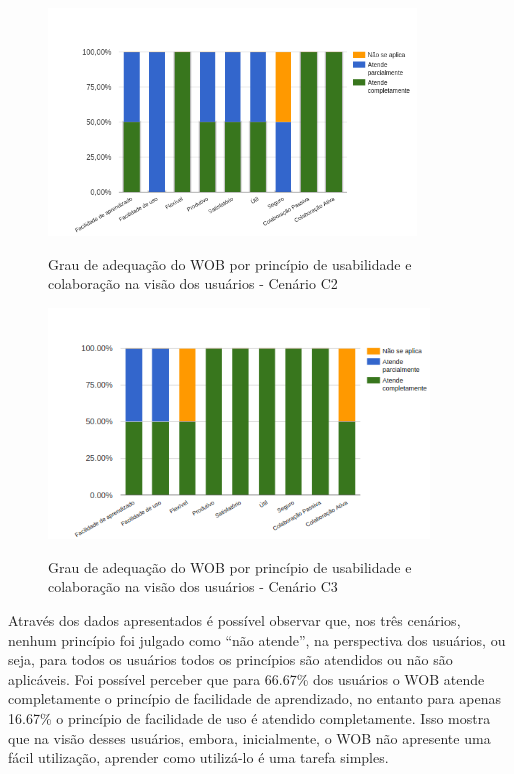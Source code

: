 \begin{figure}[!htb]
    \centering
    \caption{Grau de adequação do WOB por princípio de usabilidade e colaboração na visão dos usuários - Cenário C2}
    \includegraphics[width=0.87\textwidth]{./04-figuras/avaliacao-cenario2}
    \label{fig:avaliacao-cenario2}
\end{figure} 

\begin{figure}[!htb]
    \centering
    \caption{Grau de adequação do WOB por princípio de usabilidade e colaboração na visão dos usuários - Cenário C3}
    \includegraphics[width=0.9\textwidth]{./04-figuras/avaliacao-cenario3}
    \label{fig:avaliacao-cenario3}
\end{figure}


Através dos dados apresentados é possível observar que, nos três cenários, nenhum princípio 
foi julgado como “não atende”, na perspectiva dos usuários, ou seja, para todos os usuários 
todos os princípios são atendidos ou não são aplicáveis. Foi possível perceber que para 
66.67\% dos usuários o WOB atende completamente o princípio de facilidade de aprendizado, no 
entanto para apenas 16.67\% o princípio de facilidade de uso é atendido completamente. Isso 
mostra que na visão desses usuários, embora, inicialmente, o WOB não apresente uma fácil 
utilização, aprender como utilizá-lo é uma tarefa simples. 

